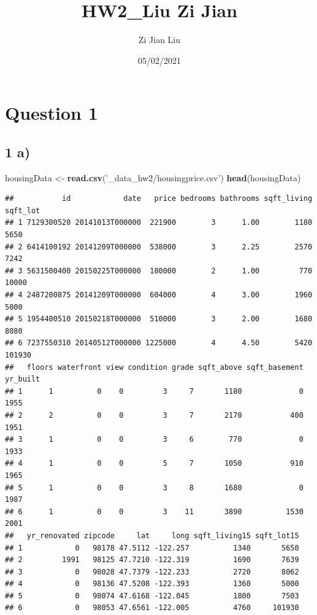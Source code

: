 \documentclass[
]{article}
\title{HW2\_Liu Zi Jian}
\author{Zi Jian Liu}
\date{05/02/2021}
\newenvironment{Shaded}{\begin{snugshade}}{\end{snugshade}}
\newcommand{\KeywordTok}[1]{\textcolor[rgb]{0.13,0.29,0.53}{\textbf{#1}}}
\newcommand{\NormalTok}[1]{#1}
\newcommand{\StringTok}[1]{\textcolor[rgb]{0.31,0.60,0.02}{#1}}
\begin{document}
\maketitle

{
\setcounter{tocdepth}{2}
\tableofcontents
}
\hypertarget{question-1}{%
\section{Question 1}\label{question-1}}

\hypertarget{a}{%
\subsection{1 a)}\label{a}}

\begin{Shaded}
\begin{Highlighting}[]
\NormalTok{housingData <-}\StringTok{ }\KeywordTok{read.csv}\NormalTok{(}\StringTok{'_data_hw2/housingprice.csv'}\NormalTok{)}
\KeywordTok{head}\NormalTok{(housingData)}
\end{Highlighting}
\end{Shaded}

\begin{verbatim}
##           id            date   price bedrooms bathrooms sqft_living sqft_lot
## 1 7129300520 20141013T000000  221900        3      1.00        1180     5650
## 2 6414100192 20141209T000000  538000        3      2.25        2570     7242
## 3 5631500400 20150225T000000  180000        2      1.00         770    10000
## 4 2487200875 20141209T000000  604000        4      3.00        1960     5000
## 5 1954400510 20150218T000000  510000        3      2.00        1680     8080
## 6 7237550310 20140512T000000 1225000        4      4.50        5420   101930
##   floors waterfront view condition grade sqft_above sqft_basement yr_built
## 1      1          0    0         3     7       1180             0     1955
## 2      2          0    0         3     7       2170           400     1951
## 3      1          0    0         3     6        770             0     1933
## 4      1          0    0         5     7       1050           910     1965
## 5      1          0    0         3     8       1680             0     1987
## 6      1          0    0         3    11       3890          1530     2001
##   yr_renovated zipcode     lat     long sqft_living15 sqft_lot15
## 1            0   98178 47.5112 -122.257          1340       5650
## 2         1991   98125 47.7210 -122.319          1690       7639
## 3            0   98028 47.7379 -122.233          2720       8062
## 4            0   98136 47.5208 -122.393          1360       5000
## 5            0   98074 47.6168 -122.045          1800       7503
## 6            0   98053 47.6561 -122.005          4760     101930
\end{verbatim}
\end{document}
